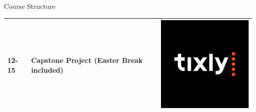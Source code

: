 \documentclass[
    NAME={Dr. Helga Ingimundardóttir},
    EMAIL={helgaingim@hi.is},
    FACULTY={Industrial Engineering},
    TITLE={Business Intelligence},
    SUBTITLE={Introduction},
    SEMINAR={IÐN610M},
    DATE={Spring, 2024}
]{HI-LaTeX/hi-beamer}
\begin{document}
\begin{frame}{Course Structure}
\begin{table}
\begin{tabular}{m{1.5cm} m{8cm} m{2.5cm}}
                12-15         & Capstone Project (Easter Break included)      & \includegraphics[height=.1\textheight]{figures/company}    \\\hline
            \end{tabular}
        \end{table}
    \end{frame}
\end{document}
